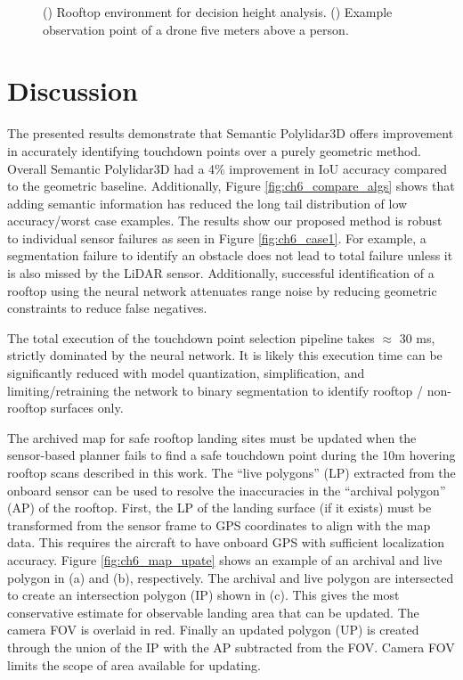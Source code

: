 \begin{figure}[ht]
\begin{subfigure}{.35\linewidth}
    \caption{\label{fig:ch6_dp_b}}
  \end{subfigure}
  \caption[Rooftop environment for decision height analysis]{ () Rooftop environment for decision height analysis.   () Example observation point of a drone five meters above a person.}\label{fig:ch6_dp}
\end{figure}

\section{Discussion}\label{sec:ch6_discussion}

The presented results demonstrate that Semantic Polylidar3D offers improvement in accurately identifying touchdown points over a purely geometric method. Overall Semantic Polylidar3D had a 4\% improvement in IoU accuracy compared to the geometric baseline. Additionally, Figure \ref{fig:ch6_compare_algs} shows that adding semantic information has reduced the long tail distribution of low accuracy/worst case examples. The results show our proposed method is robust to individual sensor failures as seen in Figure \ref{fig:ch6_case1}. For example, a segmentation failure to identify an obstacle does not lead to total failure unless it is also missed by the LiDAR sensor. Additionally, successful identification of a rooftop using the neural network attenuates range noise by reducing geometric constraints to reduce false negatives.

The total execution of the touchdown point selection pipeline takes $\approx$ 30 ms, strictly dominated by the neural network. It is likely this execution time can be significantly reduced with model quantization, simplification, and limiting/retraining the network to binary segmentation to identify rooftop / non-rooftop surfaces only.

The archived map for safe rooftop landing sites must be updated when the sensor-based planner fails to find a safe touchdown point during the 10m hovering rooftop scans described in this work.  The ``live polygons'' (LP) extracted from the onboard sensor can be used to resolve the inaccuracies in the ``archival polygon'' (AP) of the rooftop. First, the LP of the landing surface (if it exists) must be transformed from the sensor frame to GPS coordinates to align with the map data. This requires the aircraft to have onboard GPS with sufficient localization accuracy.  Figure \ref{fig:ch6_map_upate} shows an example of an archival and live polygon in (a) and (b), respectively. The archival and live polygon are intersected to create an intersection polygon (IP) shown in (c). This gives the most conservative estimate for observable landing area that can be updated. The camera FOV is overlaid in red. Finally an updated polygon (UP) is created through the union of the IP with the AP subtracted from the FOV. Camera FOV limits the scope of area available for updating. 


